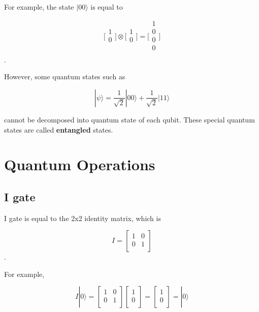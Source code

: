   For example, the state $|00\rangle$ is equal to 
  
\begin{equation}
  \Big[
\begin{array}{c}
1 \\
0 \\
\end{array}
\Big]
\otimes
 \Big[
\begin{array}{c}
1 \\
0 \\
\end{array}
\Big]
= \Big[
\begin{array}{c}
1 \\
0 \\
0 \\
0 \\
\end{array}
\Big]
\end{equation}.

 However, some quantum states such as
 
 \begin{equation}
 	|\psi\rangle = \frac{1}{\sqrt{2}}|00\rangle + \frac{1}{\sqrt{2}}|11\rangle
 \end{equation}
 
 cannot be decomposed into quantum state of each qubit.  These special quantum states are called \textbf{entangled} states.

\section{Quantum Operations}
\subsection{I gate}

I gate is equal to the 2x2 identity matrix, which is 

\begin{equation}
I = \begin{bmatrix}
1 & 0 \\
0 & 1 \\
\end{bmatrix}
\end{equation}.

For example,

\begin{equation}
 I|0\rangle = \begin{bmatrix}
1 & 0 \\
0 & 1 \\
\end{bmatrix} 
\left[
\begin{array}{c}
1 \\
0 \\
\end{array}
\right]
= \left[
\begin{array}{c}
1 \\
0 \\
\end{array}
\right]
= |0\rangle
\end{equation}

